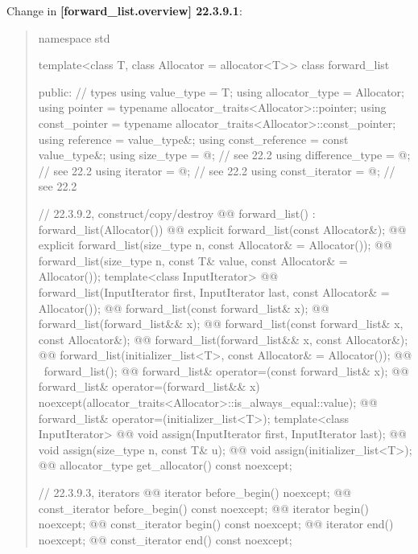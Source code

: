 \documentclass{wg21}
\begin{document}
Change in \textbf{[forward_list.overview] 22.3.9.1}:
\begin{quote}
\begin{codeblock}
namespace std {
  template<class T, class Allocator = allocator<T>>
  class forward_list {
  public:
    // types
    using value_type             = T;
    using allocator_type         = Allocator;
    using pointer                = typename allocator_traits<Allocator>::pointer;
    using const_pointer          = typename allocator_traits<Allocator>::const_pointer;
    using reference              = value_type&;
    using const_reference        = const value_type&;
    using size_type              = @\impdef@; // see 22.2
    using difference_type        = @\impdef@; // see 22.2
    using iterator               = @\impdef@; // see 22.2
    using const_iterator         = @\impdef@; // see 22.2

    // 22.3.9.2, construct/copy/destroy
    @@ forward_list() : forward_list(Allocator()) { }
    @@ explicit forward_list(const Allocator&);
    @@ explicit forward_list(size_type n, const Allocator& = Allocator());
    @@ forward_list(size_type n, const T& value, const Allocator& = Allocator());
    template<class InputIterator>
      @@ forward_list(InputIterator first, InputIterator last, const Allocator& = Allocator());
    @@ forward_list(const forward_list& x);
    @@ forward_list(forward_list&& x);
    @@ forward_list(const forward_list& x, const Allocator&);
    @@ forward_list(forward_list&& x, const Allocator&);
    @@ forward_list(initializer_list<T>, const Allocator& = Allocator());
    @@ ~forward_list();
    @@ forward_list& operator=(const forward_list& x);
    @@ forward_list& operator=(forward_list&& x)
      noexcept(allocator_traits<Allocator>::is_always_equal::value);
    @@ forward_list& operator=(initializer_list<T>);
    template<class InputIterator>
      @@ void assign(InputIterator first, InputIterator last);
    @@ void assign(size_type n, const T& u);
    @@ void assign(initializer_list<T>);
    @@ allocator_type get_allocator() const noexcept;

    // 22.3.9.3, iterators
    @@ iterator               before_begin() noexcept;
    @@ const_iterator         before_begin() const noexcept;
    @@ iterator               begin() noexcept;
    @@ const_iterator         begin() const noexcept;
    @@ iterator               end() noexcept;
    @@ const_iterator         end() const noexcept;

}}
\end{codeblock}
\end{quote}
\end{document}
